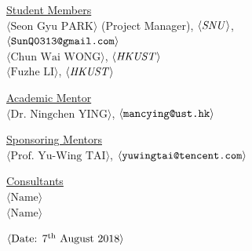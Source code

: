 \begin{center}
\vspace{0.35in}
\underline {Student Members}\\
\vspace{5pt}
$\langle \text{Seon Gyu PARK}\rangle$ (Project Manager), $\langle \text{\emph{SNU}}\rangle$,\\ 
\vspace{3pt}
$\langle \text{\texttt{SunQ0313@gmail.com}} \rangle$\\
\vspace{5pt}
$\langle \text{Chun Wai WONG}\rangle$, $\langle \text{\emph{HKUST}} \rangle$ \\
\vspace{3pt}
$\langle \text{Fuzhe LI}\rangle$, $\langle \text{\emph{HKUST}} \rangle$ \\
\vspace{3pt}


\vspace \shiftdownb
\underline {Academic Mentor} \\
\vspace{5pt}
$\langle \text{Dr. Ningchen YING}\rangle$, $\langle \text{\texttt{mancying@ust.hk}} \rangle$

\vspace \shiftdownb
\underline {Sponsoring Mentors}\\
\vspace{5pt}
$\langle \text{Prof. Yu-Wing TAI}\rangle$, $\langle \text{\texttt{yuwingtai@tencent.com}} \rangle$\\
\vspace{3pt}


\vspace \shiftdownb
\underline {Consultants}\\
\vspace{5pt}
$\langle \text{Name}\rangle$\\
\vspace{3pt}
$\langle \text{Name}\rangle$

\vspace \shiftdowna
$\langle \text{Date: $7^{\textnormal{th}}$ August 2018}\rangle$ 

\end{center}

 
